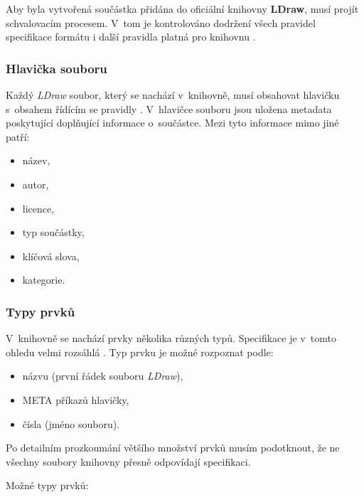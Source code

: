     Aby byla vytvořená součástka přidána do oficiální knihovny \textbf{LDraw}, musí projít schvalovacím procesem. V~tom je kontrolováno dodržení všech pravidel specifikace formátu \autocite{ldraw:file:specification} i další pravidla platná pro knihovnu \cite{ldraw:library:restrictions}.

    \subsubsection{Hlavička souboru}\label{ldraw-hlavicka}
        Každý \textit{LDraw} soubor, který se nachází v~knihovně, musí obsahovat hlavičku s~obsahem řídícím se pravidly \autocite{ldraw:header:specification}. V~hlavičce souboru jsou uložena metadata poskytující doplňující informace o~součástce. Mezi tyto informace mimo jiné patří:
        \begin{itemize}
            \item název,
            \item autor,
            \item licence,
            \item typ součástky,
            \item klíčová slova,
            \item kategorie.
        \end{itemize}
 
    \subsubsection{Typy prvků}\label{ldraw-typy-soucastek}
    V~knihovně se nachází prvky několika různých typů. Specifikace je v~tomto ohledu velmi rozsáhlá \autocite{ldraw:header:specification}\autocite{ldraw:sticker:specification}. Typ prvku je možné rozpoznat podle: 
    \begin{itemize}
        \item názvu (první řádek souboru \textit{LDraw}),
        \item META příkazů hlavičky,
        \item čísla (jméno souboru).
    \end{itemize}
    
    Po detailním prozkoumání většího množství prvků musím podotknout, že ne všechny soubory knihovny přesně odpovídají specifikaci. 

    Možné typy prvků:
    
